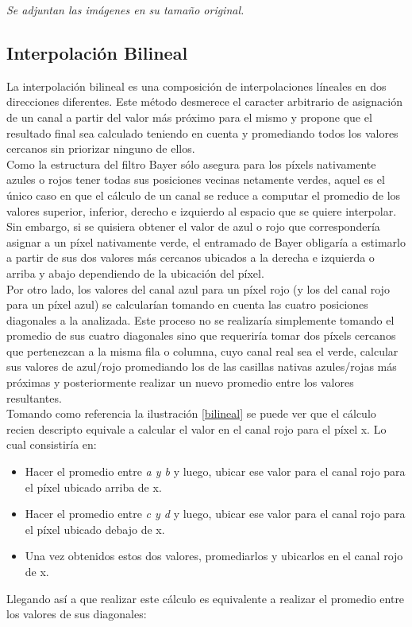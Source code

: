 \documentclass[a4paper]{article}
\begin{document}
\textit{Se adjuntan las im\'agenes en su tama\~no original.}

\newpage
\subsection{Interpolaci\'on Bilineal}

La interpolación bilineal es una composición de interpolaciones líneales en dos direcciones diferentes. Este método desmerece el caracter arbitrario de asignación de un canal a partir del valor más próximo para el mismo y propone que el resultado final sea calculado teniendo en cuenta y promediando todos los valores cercanos sin priorizar ninguno de ellos. \\

Como la estructura del filtro Bayer sólo asegura para los p\'ixels nativamente azules o rojos tener todas sus posiciones vecinas netamente verdes, aquel es el único caso en que el cálculo de un canal se reduce a computar el promedio de los valores superior, inferior, derecho e izquierdo al espacio que se quiere interpolar.\\

Sin embargo, si se quisiera obtener el valor de azul o rojo que correspondería asignar a un p\'ixel nativamente verde, el entramado de Bayer obligaría a estimarlo a partir de sus dos valores m\'as cercanos ubicados a la derecha e izquierda o arriba y abajo dependiendo de la ubicaci\'on del p\'ixel. \\

Por otro lado, los valores del canal azul para un p\'ixel rojo (y los del canal rojo para un p\'ixel azul) se calcularían tomando en cuenta las cuatro posiciones diagonales a la analizada. Este proceso no se realizar\'ia simplemente tomando el promedio de sus cuatro diagonales sino que requeriría tomar dos p\'ixels cercanos que pertenezcan a la misma fila o columna, cuyo canal real sea el verde, calcular sus valores de azul/rojo promediando los de las casillas nativas azules/rojas más próximas y posteriormente realizar un nuevo promedio entre los valores resultantes.\\

Tomando como referencia la ilustración \ref{bilineal} se puede ver que el cálculo recien descripto equivale a calcular el valor en el canal rojo para el p\'ixel x. Lo cual consistir\'ia en: 

\begin{itemize}
 
\item Hacer el promedio entre \textit{a y b} y luego, ubicar ese valor para el canal rojo para el p\'ixel ubicado arriba de x.

\item Hacer el promedio entre \textit{c y d} y luego, ubicar ese valor para el canal rojo para el p\'ixel ubicado debajo de x.

\item Una vez obtenidos estos dos valores, promediarlos y ubicarlos en el canal rojo de x.\\
\end{itemize}
Llegando as\'i a que realizar este c\'alculo es equivalente a realizar el promedio entre los valores de sus diagonales:
\end{document}
